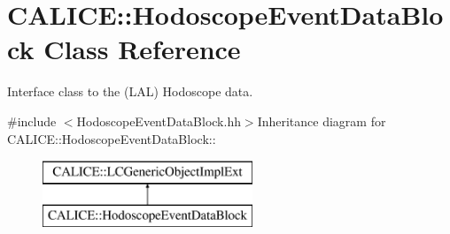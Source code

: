 \section{CALICE::HodoscopeEventDataBlock Class Reference}
\label{classCALICE_1_1HodoscopeEventDataBlock}


Interface class to the (LAL) Hodoscope data.  


{\ttfamily \#include $<$HodoscopeEventDataBlock.hh$>$}Inheritance diagram for CALICE::HodoscopeEventDataBlock::\begin{figure}[H]
\begin{center}
\leavevmode
\includegraphics[height=2cm]{classCALICE_1_1HodoscopeEventDataBlock}
\end{center}
\end{figure}
